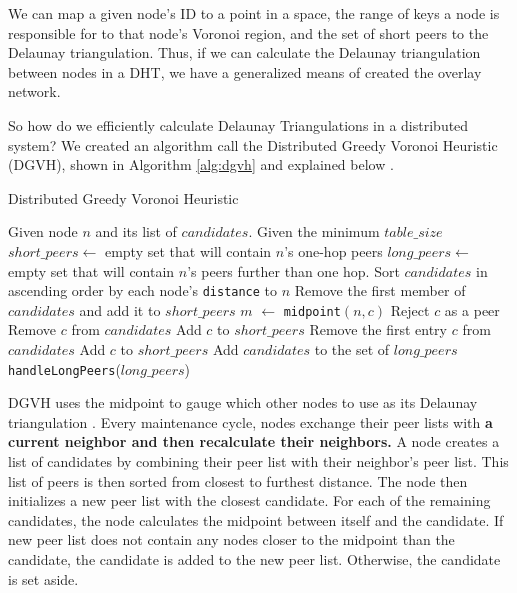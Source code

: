 \documentclass[11pt,conference]{IEEEtran}
\begin{document}
We can map a given node's ID to a point in a space, the range of keys a node is responsible for to that node's Voronoi region, and the set of short peers to the Delaunay triangulation.
Thus, if we can calculate the Delaunay triangulation between nodes in a DHT, we have a generalized means of created the overlay network.


So how do we efficiently calculate Delaunay Triangulations in a distributed system?
We created an algorithm call the Distributed Greedy Voronoi Heuristic (DGVH), shown in Algorithm \ref{alg:dgvh} and explained below \cite{dgvh}.


\begin{algorithm} %
	\caption{Distributed Greedy Voronoi Heuristic}
	\label{alg:dgvh}
	\begin{algorithmic}[1]  %
		\STATE Given node $n$ and its list of $candidates$.
		\STATE Given the minimum $table\_size$
		\STATE $short\_peers \leftarrow$ empty set that will contain $n$'s one-hop peers
		\STATE $long\_peers \leftarrow$ empty set that will contain $n$'s peers further than one hop.
		\STATE Sort $candidates$ in ascending order by each node's \texttt{distance} to $n$
		\STATE Remove the first member of $candidates$ and add it to $short\_peers$
			\STATE $m$ $ \leftarrow $ \texttt{midpoint}$( n, c )$
				\STATE Reject $c$ as a peer
			\ELSE
				\STATE Remove $c$ from $candidates$
				\STATE Add $c$ to $short\_peers$
			\ENDIF
		\ENDFOR
			\STATE Remove the first entry $c$ from $candidates$
			\STATE Add $c$ to $short\_peers$
		\ENDWHILE
		\STATE Add $candidates$ to the set of $long\_peers$	
		\STATE \texttt{handleLongPeers}($long\_peers$)
	\end{algorithmic}
\end{algorithm} 

DGVH uses the midpoint to gauge which other nodes to use as its Delaunay triangulation \cite{dgvh}.
Every maintenance cycle, nodes exchange their peer lists with\textbf{ a current neighbor and then recalculate their neighbors.  }
A node creates a list of candidates by combining their peer list with  their neighbor's peer list.
This list of peers is then sorted from closest to furthest distance.
The node then initializes a new peer list with the closest candidate.
For each of the remaining candidates, the node calculates the midpoint between itself and the candidate.
If new peer list does not contain any nodes closer to the midpoint than the candidate, the candidate is added to the new peer list.
Otherwise, the candidate is set aside.
\end{document}
